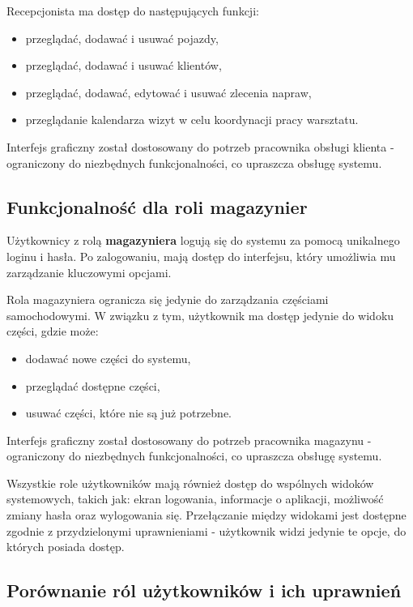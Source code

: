 Recepcjonista ma dostęp do następujących funkcji:
\begin{itemize}
    \item przeglądać, dodawać i usuwać pojazdy,
    \item przeglądać, dodawać i usuwać klientów,
    \item przeglądać, dodawać, edytować i usuwać zlecenia napraw,
    \item przeglądanie kalendarza wizyt w celu koordynacji pracy warsztatu.
\end{itemize}

Interfejs graficzny został dostosowany do potrzeb pracownika obsługi klienta - ograniczony do niezbędnych funkcjonalności, co upraszcza obsługę systemu.

\subsection{Funkcjonalność dla roli magazynier}
\label{sec:funkcjonalnoscMagazyniera}
Użytkownicy z rolą \textbf{magazyniera} logują się do systemu za pomocą unikalnego loginu i hasła. Po zalogowaniu, mają dostęp do interfejsu, który umożliwia mu zarządzanie kluczowymi opcjami.

Rola magazyniera ogranicza się jedynie do zarządzania częściami samochodowymi. W związku z tym, użytkownik ma dostęp jedynie do widoku części, gdzie może:
\begin{itemize}
    \item dodawać nowe części do systemu,
    \item przeglądać dostępne części,
    \item usuwać części, które nie są już potrzebne.
\end{itemize}

Interfejs graficzny został dostosowany do potrzeb pracownika magazynu - ograniczony do niezbędnych funkcjonalności, co upraszcza obsługę systemu.


Wszystkie role użytkowników mają również dostęp do wspólnych widoków systemowych, takich jak: ekran logowania, informacje o aplikacji, możliwość zmiany hasła oraz wylogowania się. Przełączanie między widokami jest dostępne zgodnie z przydzielonymi uprawnieniami - użytkownik widzi jedynie te opcje, do których posiada dostęp.

\subsection{Porównanie ról użytkowników i ich uprawnień}
\label{sec:podsumowanieFunkcjonalnosci}

